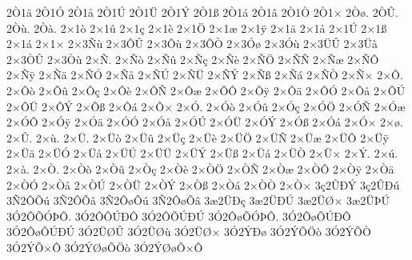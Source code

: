 {2^^d21^^e4
2^^d21^^d3
2^^d21^^e5
2^^d21^^da
2^^d21^^dc
2^^d21^^dd
2^^d21^^df
2^^d21^^e1
2^^d21^^e2
2^^d21^^d2
2^^d21^^d7
2^^d2^^f8.
2^^d2^^db.
2^^d2^^f9.
2^^d2^^e0.
2^^d71^^f2
2^^d71^^fb
2^^d71^^e7
2^^d71^^e8
2^^d71^^d6
2^^d71^^e6
2^^d71^^ff
2^^d71^^e4
2^^d71^^e5
2^^d71^^da
2^^d71^^df
2^^d71^^e1
2^^d71^^d7
2^^d73^^d1^^f9
2^^d73^^d4^^db
2^^d73^^d4^^f9
2^^d73^^d4^^d2
2^^d73^^d3^^f8
2^^d73^^d3^^f9
2^^d73^^dc^^db
2^^d73^^dc^^e0
2^^d73^^d2^^db
2^^d73^^d2^^f9
2^^d7^^d1.
2^^d7^^d1^^f2
2^^d7^^d1^^fb
2^^d7^^d1^^e7
2^^d7^^d1^^e8
2^^d7^^d1^^d6
2^^d7^^d1^^d1
2^^d7^^d1^^e6
2^^d7^^d1^^d4
2^^d7^^d1^^ff
2^^d7^^d1^^e4
2^^d7^^d1^^d3
2^^d7^^d1^^e5
2^^d7^^d1^^da
2^^d7^^d1^^dc
2^^d7^^d1^^dd
2^^d7^^d1^^df
2^^d7^^d1^^e1
2^^d7^^d1^^d2
2^^d7^^d1^^d7
2^^d7^^d4.
2^^d7^^d4^^f2
2^^d7^^d4^^fb
2^^d7^^d4^^e7
2^^d7^^d4^^e8
2^^d7^^d4^^d1
2^^d7^^d4^^e6
2^^d7^^d4^^d4
2^^d7^^d4^^ff
2^^d7^^d4^^e4
2^^d7^^d4^^d3
2^^d7^^d4^^e5
2^^d7^^d4^^da
2^^d7^^d4^^dc
2^^d7^^d4^^dd
2^^d7^^d4^^df
2^^d7^^d4^^e1
2^^d7^^d4^^d7
2^^d7^^d3.
2^^d7^^d3^^f2
2^^d7^^d3^^fb
2^^d7^^d3^^e7
2^^d7^^d3^^d6
2^^d7^^d3^^d1
2^^d7^^d3^^e6
2^^d7^^d3^^d4
2^^d7^^d3^^ff
2^^d7^^d3^^e4
2^^d7^^d3^^d3
2^^d7^^d3^^e5
2^^d7^^d3^^da
2^^d7^^d3^^dc
2^^d7^^d3^^dd
2^^d7^^d3^^df
2^^d7^^d3^^e1
2^^d7^^d3^^d7
2^^d7^^f8.
2^^d7^^db.
2^^d7^^f9.
2^^d7^^dc.
2^^d7^^dc^^f2
2^^d7^^dc^^fb
2^^d7^^dc^^e7
2^^d7^^dc^^e8
2^^d7^^dc^^d6
2^^d7^^dc^^d1
2^^d7^^dc^^e6
2^^d7^^dc^^d4
2^^d7^^dc^^ff
2^^d7^^dc^^e4
2^^d7^^dc^^d3
2^^d7^^dc^^e5
2^^d7^^dc^^da
2^^d7^^dc^^dc
2^^d7^^dc^^dd
2^^d7^^dc^^df
2^^d7^^dc^^e1
2^^d7^^dc^^d2
2^^d7^^dc^^d7
2^^d7^^dd.
2^^d7^^fa.
2^^d7^^e0.
2^^d7^^d2.
2^^d7^^d2^^f2
2^^d7^^d2^^fb
2^^d7^^d2^^e7
2^^d7^^d2^^e8
2^^d7^^d2^^d6
2^^d7^^d2^^d1
2^^d7^^d2^^e6
2^^d7^^d2^^d4
2^^d7^^d2^^ff
2^^d7^^d2^^e4
2^^d7^^d2^^d3
2^^d7^^d2^^e5
2^^d7^^d2^^da
2^^d7^^d2^^dc
2^^d7^^d2^^dd
2^^d7^^d2^^df
2^^d7^^d2^^e1
2^^d7^^d2^^d2
2^^d7^^d2^^d7
3^^e72^^db^^d0^^dd
3^^e72^^db^^d0^^fa
3^^d12^^d4^^d5^^fa
3^^d12^^d4^^d5^^e2
3^^d12^^d4^^f8^^d5^^fa
3^^d12^^d4^^f8^^d5^^e2
3^^e62^^dc^^d0^^e7
3^^e62^^dc^^d0^^da
3^^e62^^dc^^d8^^d7
3^^e62^^dc^^de^^da
3^^d32^^d4^^d5^^d3^^de^^d4.
3^^d32^^d4^^d5^^da^^d0^^d4
3^^d32^^d4^^d5^^da^^d0^^da
3^^d32^^d4^^f8^^d5^^d3^^de^^d4.
3^^d32^^d4^^f8^^d5^^da^^d0^^d4
3^^d32^^d4^^f8^^d5^^da^^d0^^da
3^^d32^^dc^^d8^^db
3^^d32^^dc^^d8^^f9
3^^d32^^dc^^d8^^d7
3^^d32^^dd^^d0^^f8
3^^d32^^dd^^d5^^d6^^f2
3^^d32^^dd^^d5^^d2
3^^d32^^dd^^d5^^d7^^d4
3^^d32^^dd^^d8^^f8^^d5^^d6^^f2
3^^d32^^dd^^d8^^f8^^d5^^d7^^d4
}
